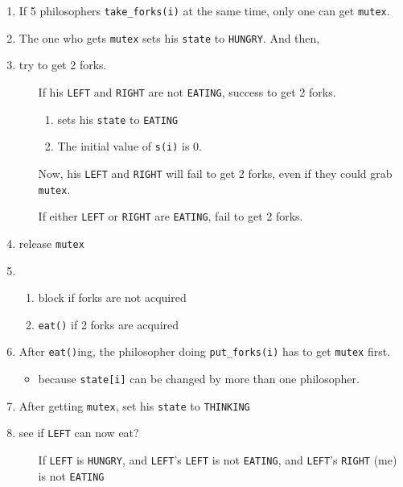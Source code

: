 \begin{enumerate}
\item If 5 philosophers \texttt{take\_forks(i)} at the same time, only one can get \texttt{mutex}.
\item The one who gets \texttt{mutex} sets his \texttt{state} to \texttt{HUNGRY}. And then,
\item {} try to get 2 forks.
  \begin{enumerate}
  \item[If] his \texttt{LEFT} and \texttt{RIGHT} are not \texttt{EATING}, success to get 2 forks.
    \begin{enumerate}
    \item sets his \texttt{state} to \texttt{EATING}
    \item {} The initial value of \texttt{s(i)} is 0.
    \end{enumerate}
    Now, his \texttt{LEFT} and \texttt{RIGHT} will fail to get 2 forks, even if
    they could grab \texttt{mutex}.
  \item [If] either \texttt{LEFT} or \texttt{RIGHT} are \texttt{EATING}, fail to get 2 forks.
  \end{enumerate}
\item release \texttt{mutex}
\item {}
  \begin{enumerate}
  \item block if forks are not acquired
  \item \texttt{eat()} if 2 forks are acquired
  \end{enumerate}
\item After \texttt{eat()}ing, the philosopher doing \texttt{put\_forks(i)} has to get
  \texttt{mutex} first.
  \begin{itemize}
  \item because \texttt{state[i]} can be changed by more than one philosopher.
  \end{itemize}
\item After getting \texttt{mutex}, set his \texttt{state} to \texttt{THINKING}
\item {} see if \texttt{LEFT} can now eat?
  \begin{enumerate}
  \item [If] \texttt{LEFT} is \texttt{HUNGRY}, and \texttt{LEFT}'s \texttt{LEFT} is not
    \texttt{EATING}, and \texttt{LEFT}'s \texttt{RIGHT} (me) is not
    \texttt{EATING}

\end{enumerate}
\end{enumerate}
